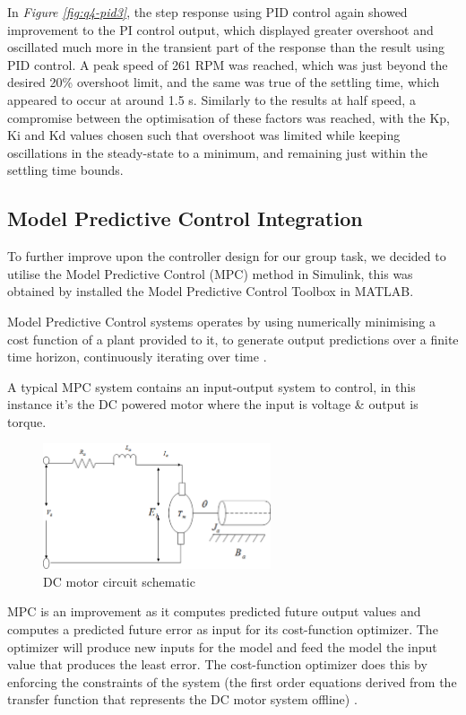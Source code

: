 \documentclass[11pt, onecolumn]{article}
\begin{document}
\par In \textit{Figure \ref{fig:q4-pid3}}, the step response using PID control again showed improvement to the PI control output, which displayed greater overshoot and oscillated much more in the transient part of the response than the result using PID control. A peak speed of 261 RPM was reached, which was just beyond the desired 20\% overshoot limit, and the same was true of the settling time, which appeared to occur at around 1.5 s. Similarly to the results at half speed, a compromise between the optimisation of these factors was reached, with the Kp, Ki and Kd values chosen such that overshoot was limited while keeping oscillations in the steady-state to a minimum, and remaining just within the settling time bounds.
\subsection*{Model Predictive Control Integration}
\par To further improve upon the controller design for our group task, we decided to utilise the Model Predictive Control (MPC) method in Simulink, this was obtained by installed the Model Predictive Control Toolbox in MATLAB.
\par Model Predictive Control systems operates by using numerically minimising a cost function of a plant provided to it, to generate output predictions over a finite time horizon, continuously iterating over time \cite{Nikolaou2001}.
\par A typical MPC system contains an input-output system to control, in this instance it’s the DC powered motor where the input is voltage \& output is torque.
\begin{figure}[h!]
    \centering
    \includegraphics[width=0.6\textwidth]{q4-schematic.png}
    \caption{DC motor circuit schematic \cite{article}}
    \label{fig:q4-schematic}
\end{figure}
\par MPC is an improvement as it computes predicted future output values and computes a predicted future error as input for its cost-function optimizer. The optimizer will produce new inputs for the model and feed the model the input value that produces the least error. The cost-function optimizer does this by enforcing the constraints of the system (the first order equations derived from the transfer function that represents the DC motor system offline) \cite{libretexts123MIMO}.
\end{document}
